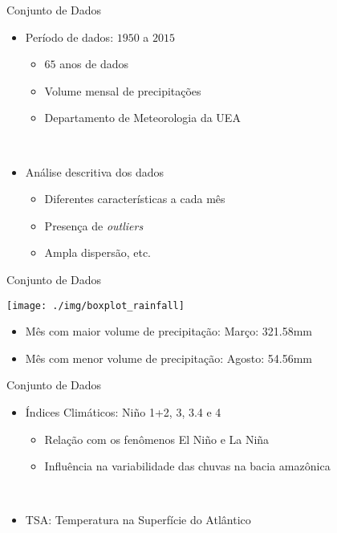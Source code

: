 \begin{frame}{Conjunto de Dados}
\begin{itemize}
  \item \alert{Período de dados}: $1950$ a $2015$
  \begin{itemize}
    \item $65$ anos de dados
    \item Volume mensal de precipitações
    \item Departamento de Meteorologia da UEA
  \end{itemize}
  \ \ \newline
  \item Análise descritiva dos dados
  \begin{itemize}
    \item Diferentes características a cada mês
    \item Presença de \emph{outliers}
    \item Ampla dispersão, etc.
  \end{itemize}
\end{itemize}
\end{frame}

\begin{frame}{Conjunto de Dados}
  \begin{center}
  	\texttt{[image: ./img/boxplot\_rainfall]}
  \end{center}

  	\begin{itemize}
  		\item Mês com maior volume de precipitação: \alert{Março: 321.58mm}
  		\item Mês com menor volume de precipitação: \alert{Agosto: 54.56mm}
  	\end{itemize}
  \end{frame}


\begin{frame}{Conjunto de Dados}
  \begin{itemize}
    \item \alert{Índices Climáticos}: Niño 1+2, 3, 3.4 e 4
    \begin{itemize}
      \item Relação com os fenômenos El Niño e La Niña
      \item Influência na variabilidade das chuvas na bacia amazônica
    \end{itemize}
    \ \ \newline
    \item \alert{TSA}: Temperatura na Superfície do Atlântico
  \end{itemize}
\end{frame}
